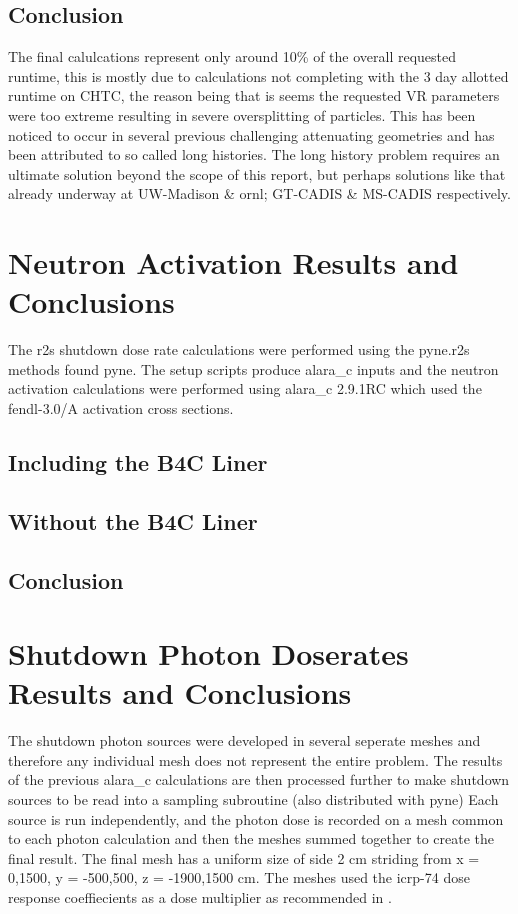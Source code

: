 \documentclass[12pt]{article}
\begin{document}
\subsection{Conclusion}
The final calulcations represent only around 10\% of the overall requested
runtime, this is mostly due to calculations not completing with the 3 day
allotted runtime on CHTC, the reason being that is seems the requested VR
parameters were too extreme resulting in severe oversplitting of particles.
This has been noticed to occur in several previous challenging attenuating
geometries and has been attributed to so called long histories. The long history
problem requires an ultimate solution beyond the scope of this report, but
perhaps solutions like that already underway at UW-Madison \& \gls{ornl}; GT-CADIS
\& MS-CADIS respectively.
\newpage
\clearpage

\section{Neutron Activation Results and Conclusions}
The \gls{r2s} shutdown dose rate calculations were performed using the pyne.r2s
methods found \gls{pyne}. The setup scripts produce \gls{alara_c} inputs and the neutron
activation calculations were performed using \gls{alara_c} 2.9.1RC which used the
\gls{fendl}-3.0/A activation cross sections. 
\subsection{Including the B4C Liner}
\subsection{Without the B4C Liner}
\subsection{Conclusion}
\newpage
\section{Shutdown Photon Doserates Results and Conclusions}
The shutdown photon sources were developed in several seperate meshes and
therefore any individual mesh does not represent the entire problem. The
results of the previous \gls{alara_c} calculations are then processed further to make
shutdown sources to be read into a sampling subroutine (also distributed with
\gls{pyne}) Each source is run independently, and the photon dose is recorded on a
mesh common to each photon calculation and then the meshes summed together to
create the final result. The final mesh has a uniform size of side 2 cm striding
from x = {0,1500}, y = {-500,500}, z = {-1900,1500} cm. The meshes used the
\gls{icrp}-74 dose response coeffiecients as a dose multiplier as recommended in
\cite{iter_sdr_coeffs}.
\end{document}
